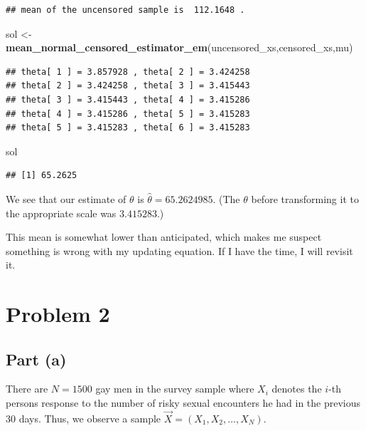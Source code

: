 \documentclass[
]{article}
\newenvironment{Shaded}{\begin{snugshade}}{\end{snugshade}}
\newcommand{\FunctionTok}[1]{\textcolor[rgb]{0.13,0.29,0.53}{\textbf{#1}}}
\newcommand{\NormalTok}[1]{#1}
\newcommand{\OtherTok}[1]{\textcolor[rgb]{0.56,0.35,0.01}{#1}}
\begin{document}
\begin{verbatim}
## mean of the uncensored sample is  112.1648 .
\end{verbatim}

\begin{Shaded}
\begin{Highlighting}[]
\NormalTok{sol }\OtherTok{\textless{}{-}} \FunctionTok{mean\_normal\_censored\_estimator\_em}\NormalTok{(uncensored\_xs,censored\_xs,mu)}
\end{Highlighting}
\end{Shaded}

\begin{verbatim}
## theta[ 1 ] = 3.857928 , theta[ 2 ] = 3.424258 
## theta[ 2 ] = 3.424258 , theta[ 3 ] = 3.415443 
## theta[ 3 ] = 3.415443 , theta[ 4 ] = 3.415286 
## theta[ 4 ] = 3.415286 , theta[ 5 ] = 3.415283 
## theta[ 5 ] = 3.415283 , theta[ 6 ] = 3.415283
\end{verbatim}

\begin{Shaded}
\begin{Highlighting}[]
\NormalTok{sol}
\end{Highlighting}
\end{Shaded}

\begin{verbatim}
## [1] 65.2625
\end{verbatim}

We see that our estimate of \(\theta\) is \(\hat{\theta} = 65.2624985\).
(The \(\theta\) before transforming it to the appropriate scale was
\(3.415283\).)

This mean is somewhat lower than anticipated, which makes me suspect
something is wrong with my updating equation. If I have the time, I will
revisit it.

\hypertarget{problem-2}{%
\section{Problem 2}\label{problem-2}}

\hypertarget{part-a-1}{%
\subsection{Part (a)}\label{part-a-1}}

There are \(N=1500\) gay men in the survey sample where \(X_i\) denotes
the \(i\)-th persons response to the number of risky sexual encounters
he had in the previous \(30\) days. Thus, we observe a sample
\(\vec{X} = (X_1,X_2,\ldots, X_N)\).
\end{document}

